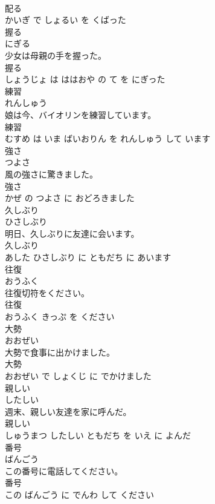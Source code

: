 \documentclass[8pt]{extreport}
\begin{document}
\begin{CJK}{UTF8}{min}
\\	配る 
\\	かいぎ で しょるい を くばった			
\\	握る	
\\	にぎる			
\\	少女は母親の手を握った。	
\\	握る 
\\	しょうじょ は ははおや の て を にぎった			
\\	練習	
\\	れんしゅう			
\\	娘は今、バイオリンを練習しています。	
\\	練習 
\\	むすめ は いま ばいおりん を れんしゅう して います			
\\	強さ	
\\	つよさ			
\\	風の強さに驚きました。	
\\	強さ 
\\	かぜ の つよさ に おどろきました			
\\	久しぶり	
\\	ひさしぶり			
\\	明日、久しぶりに友達に会います。	
\\	久しぶり 
\\	あした ひさしぶり に ともだち に あいます			
\\	往復	
\\	おうふく			
\\	往復切符をください。	
\\	往復 
\\	おうふく きっぷ を ください			
\\	大勢	
\\	おおぜい			
\\	大勢で食事に出かけました。	
\\	大勢 
\\	おおぜい で しょくじ に でかけました			
\\	親しい	
\\	したしい			
\\	週末、親しい友達を家に呼んだ。	
\\	親しい 
\\	しゅうまつ したしい ともだち を いえ に よんだ			
\\	番号	
\\	ばんごう			
\\	この番号に電話してください。	
\\	番号 
\\	この ばんごう に でんわ して ください			

\end{CJK}
\end{document}
